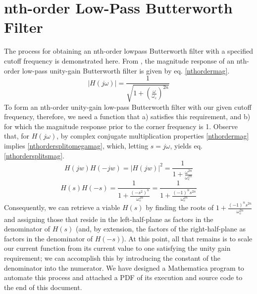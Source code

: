\documentclass[journal]{IEEEtran}
\begin{document}
\appendices
\section{nth-order Low-Pass Butterworth Filter}
The process for obtaining an nth-order lowpass Butterworth filter with a specified cutoff frequency is demonstrated here.
From \cite{nilsson}, the magnitude response of an nth-order low-pass unity-gain Butterworth filter is given by eq. \eqref{nthordermag}. 
\begin{equation}
\left|H\left(j\omega\right)\right|=\frac{1}{\sqrt{1+\left(\frac{\omega}{\omega_c}\right)^{2n}}}
\label{nthordermag}
\end{equation}
	To form an nth-order unity-gain low-pass Butterworth filter with our given cutoff frequency, therefore, we need a function that a) satisfies this requirement, and b) for which the magnitude response prior to the corner frequency is 1. 
Observe that, for $H(j\omega)$, by complex conjugate multiplication properties \eqref{nthordermag} implies \eqref{nthordersplitomegamag}, which, letting $s=j\omega$, yields eq. \eqref{nthordersplitsmag}.
\begin{equation}
H\left(jw\right)H\left(-jw\right)=\left|H\left(jw\right)\right|^2=\frac{1}{1+\frac{\omega^{2n}}{\omega_c^{2n}}}
\label{nthordersplitomegamag}
\end{equation}
\begin{equation}
H\left.\left(s\right.\right)H\left.\left(-s\right.\right)=\frac{1}{1+\frac{\left(-s^2\right)^n}{\omega_c^{2n}}}=\frac{1}{1+\frac{\left(-1\right)^ns^{2n}}{\omega_c^{2n}}}
\label{nthordersplitsmag}
\end{equation}
	Consequently, we can retrieve a viable $H(s)$ by finding the roots of $1+\frac{\left(-1\right)^ns^{2n}}{\omega_c^{2n}}$ and assigning those that reside in the left-half-plane as factors in the denominator of $H(s)$ (and, by extension, the factors of the right-half-plane as factors in the denominator of $H(-s)$). At this point, all that remains is to scale our current function from its current value to one satisfying the unity gain requirement; we can accomplish this by introducing the constant of the denominator into the numerator. We have designed a Mathematica program to automate this process and attached a PDF of its execution and source code to the end of this document.





\ifCLASSOPTIONcaptionsoff
  \newpage
\fi
\end{document}
